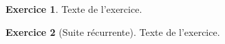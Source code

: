 \documentclass{article}
\theoremstyle{definition}
\newtheorem{exercice}{Exercice}
\begin{document}
    \begin{exercice}
    Texte de l'exercice.
    \end{exercice}

    \begin{exercice}[Suite récurrente]
    Texte de l'exercice.
    \end{exercice}

    
\end{document}
